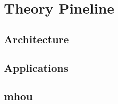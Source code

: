 
\chapter{Theory Pineline}
\label{ch:pine}
\minitoc
\adjustmtc



\section{Architecture}
\label{sec:pine/arch}


\section{Applications}
\label{sec:pine/app}


\section[Missing Higher Order uncertainties]{\acrlong*{mhou}}
\label{sec:pine/mhou}

